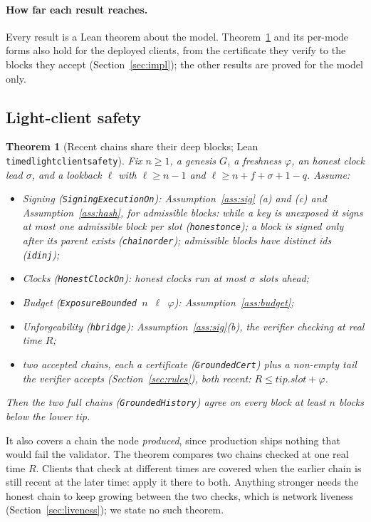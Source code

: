 \documentclass[10pt]{article}
\newtheorem{theorem}{Theorem}
\DeclareRobustCommand{\code}[1]{{\renewcommand{\_}{\textunderscore\allowbreak}\texttt{#1}}}
\newcommand{\quorum}{\ensuremath{q}}
\newcommand{\fmax}{\ensuremath{f}}
\begin{document}
\paragraph{How far each result reaches.} Every result is a Lean theorem
about the model. Theorem~\ref{thm:lc} and its per-mode forms also hold
for the deployed clients, from the certificate they verify to the blocks
they accept (Section~\ref{sec:impl}); the other results are proved for
the model only.

\subsection{Light-client safety}
\label{sec:lc}

\begin{theorem}[Recent chains share their deep blocks; Lean
\code{timed\_light\_client\_safety}]\label{thm:lc}
Fix $n \ge 1$, a genesis $G$, a freshness $\varphi$, an honest clock
lead $\sigma$, and a lookback $\ell$ with $\ell \ge n - 1$ and
$\ell \ge n + \fmax + \sigma + 1 - \quorum$. Assume:
\begin{itemize}\setlength{\itemsep}{0pt}\setlength{\parskip}{0pt}\setlength{\parsep}{0pt}
\item \emph{Signing} (\code{SigningExecutionOn}): Assumption~\ref{ass:sig}
  (a) and (c) and Assumption~\ref{ass:hash}, for admissible blocks:
  while a key is unexposed it signs at most one admissible block per slot
  (\code{honest\_once}); a block is signed only after its parent exists
  (\code{chain\_order}); admissible blocks have distinct ids
  (\code{id\_inj});
\item \emph{Clocks} (\code{HonestClockOn}): honest clocks run at most
  $\sigma$ slots ahead;
\item \emph{Budget} (\code{ExposureBounded}~$n$~$\ell$~$\varphi$):
  Assumption~\ref{ass:budget};
\item \emph{Unforgeability} (\code{hbridge}): Assumption~\ref{ass:sig}(b),
  the verifier checking at real time $R$;
\item \emph{two accepted chains}, each a certificate (\code{GroundedCert})
  plus a non-empty tail the verifier accepts (Section~\ref{sec:rules}),
  both recent: $R \le \mathit{tip.slot} + \varphi$.
\end{itemize}
Then the two full chains (\code{GroundedHistory}) agree on every block at
least $n$ blocks below the lower tip.
\end{theorem}

It also covers a chain the node \emph{produced}, since production ships
nothing that would fail the validator. The theorem compares two chains
checked at one real time $R$. Clients that check at different times are
covered when the earlier chain is still recent at the later time: apply
it there to both. Anything stronger needs the honest chain to keep
growing between the two checks, which is network liveness
(Section~\ref{sec:liveness}); we state no such theorem.
\end{document}
